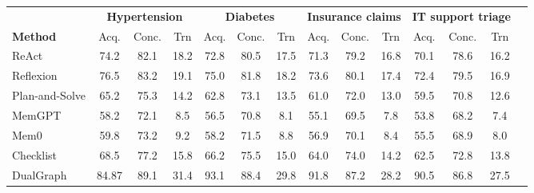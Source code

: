 \begin{tabular}{@{}lccccccccccccc@{}}
\toprule
& \multicolumn{3}{c}{\textbf{Hypertension}} & \multicolumn{3}{c}{\textbf{Diabetes}} & \multicolumn{3}{c}{\textbf{Insurance claims}} & \multicolumn{3}{c}{\textbf{IT support triage}} \\
\cmidrule(lr){2-4}\cmidrule(lr){5-7}\cmidrule(lr){8-10}\cmidrule(lr){11-13}
\textbf{Method} & Acq. & Conc. & Trn & Acq. & Conc. & Trn & Acq. & Conc. & Trn & Acq. & Conc. & Trn \\
\midrule
ReAct & 74.2 & 82.1 & 18.2 & 72.8 & 80.5 & 17.5 & 71.3 & 79.2 & 16.8 & 70.1 & 78.6 & 16.2 \\
Reflexion & 76.5 & 83.2 & 19.1 & 75.0 & 81.8 & 18.2 & 73.6 & 80.1 & 17.4 & 72.4 & 79.5 & 16.9 \\
Plan-and-Solve & 65.2 & 75.3 & 14.2 & 62.8 & 73.1 & 13.5 & 61.0 & 72.0 & 13.0 & 59.5 & 70.8 & 12.6 \\
MemGPT & 58.2 & 72.1 & 8.5 & 56.5 & 70.8 & 8.1 & 55.1 & 69.5 & 7.8 & 53.8 & 68.2 & 7.4 \\
Mem0 & 59.8 & 73.2 & 9.2 & 58.2 & 71.5 & 8.8 & 56.9 & 70.1 & 8.4 & 55.5 & 68.9 & 8.0 \\
Checklist & 68.5 & 77.2 & 15.8 & 66.2 & 75.5 & 15.0 & 64.0 & 74.0 & 14.2 & 62.5 & 72.8 & 13.8 \\
DualGraph & 84.87 & 89.1 & 31.4 & 93.1 & 88.4 & 29.8 & 91.8 & 87.2 & 28.2 & 90.5 & 86.8 & 27.5 \\
\bottomrule
\end{tabular}
